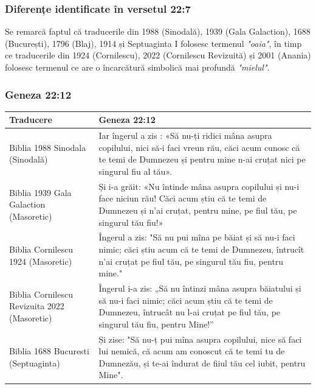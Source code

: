 \documentclass[12pt,a4paper]{article}
\begin{document}
\subsubsection{Diferențe identificate în versetul 22:7}
Se remarcă faptul că traducerile din 1988 (Sinodală), 1939 (Gala Galaction), 1688 (București), 1796 (Blaj), 1914 și Septuaginta I folosesc termenul \emph{"oaia"}, în timp ce traducerile din 1924 (Cornilescu), 2022 (Cornilescu Revizuită) și 2001 (Anania) folosesc termenul ce are o încarcătură simbolică mai profundă \emph{"mielul"}.

\subsubsection{Geneza 22:12}

\begin{longtable}{|p{3cm}|L|}
    \hline
    \textbf{Traducere}                           & \textbf{Geneza 22:12}                                                                                                                                                                       \\
    \hline
    Biblia 1988 Sinodala (Sinodală)              & Iar îngerul a zis : «Să nu-ți ridici mâna asupra copilului, nici să-i faci vreun rău, căci acum cunosc că te temi de Dumnezeu și pentru mine n-ai cruțat nici pe singurul fiu al tău».      \\
    \hline
    Biblia 1939 Gala Galaction (Masoretic)       & Și i-a grăit: «Nu întinde mâna asupra copilului și nu-i face niciun rău! Căci acum știu că te temi de Dumnezeu și n'ai cruțat, pentru mine, pe fiul tău, pe singurul tău fiu!»              \\
    \hline
    Biblia Cornilescu 1924 (Masoretic)           & Îngerul a zis: "Să nu pui mîna pe băiat și să nu-i faci nimic; căci știu acum că te temi de Dumnezeu, întrucît n'ai cruțat pe fiul tău, pe singurul tău fiu, pentru mine."                  \\
    \hline
    Biblia Cornilescu Revizuita 2022 (Masoretic) & Îngerul i-a zis: „Să nu întinzi mâna asupra băiatului și să nu-i faci nimic; căci acum știu că te temi de Dumnezeu, întrucât nu l-ai cruțat pe fiul tău, pe singurul tău fiu, pentru Mine!” \\
    \hline
    Biblia 1688 Bucuresti (Septuaginta)          & Și zise: "Să nu-ț pui mîna asupra copilului, nice să faci lui nemică, că acum am conoscut că te temi tu de Dumnezău, și te-ai îndurat de fiiul tău cel iubit, pentru Mine".                 \\

\end{longtable}
\end{document}
